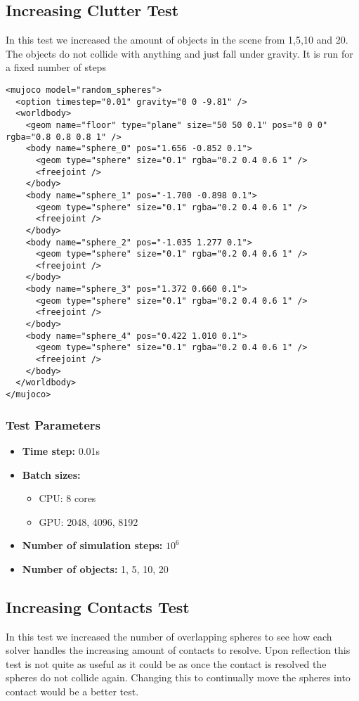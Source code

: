 \documentclass[11pt,a4paper]{article}
\begin{document}
\subsection{Increasing Clutter Test}
In this test we increased the amount of objects in the scene from 1,5,10 and 20. The objects do not collide with anything and just fall under gravity. It is run for a fixed number of steps

\begin{lstlisting}[style=xmlstyle, caption={Cluttered XML model}, label=lst:cluttered_xml]
<mujoco model="random_spheres">
  <option timestep="0.01" gravity="0 0 -9.81" />
  <worldbody>
    <geom name="floor" type="plane" size="50 50 0.1" pos="0 0 0" rgba="0.8 0.8 0.8 1" />
    <body name="sphere_0" pos="1.656 -0.852 0.1">
      <geom type="sphere" size="0.1" rgba="0.2 0.4 0.6 1" />
      <freejoint />
    </body>
    <body name="sphere_1" pos="-1.700 -0.898 0.1">
      <geom type="sphere" size="0.1" rgba="0.2 0.4 0.6 1" />
      <freejoint />
    </body>
    <body name="sphere_2" pos="-1.035 1.277 0.1">
      <geom type="sphere" size="0.1" rgba="0.2 0.4 0.6 1" />
      <freejoint />
    </body>
    <body name="sphere_3" pos="1.372 0.660 0.1">
      <geom type="sphere" size="0.1" rgba="0.2 0.4 0.6 1" />
      <freejoint />
    </body>
    <body name="sphere_4" pos="0.422 1.010 0.1">
      <geom type="sphere" size="0.1" rgba="0.2 0.4 0.6 1" />
      <freejoint />
    </body>
  </worldbody>
</mujoco>
\end{lstlisting}

\subsubsection{Test Parameters}
\begin{itemize}
    \item \textbf{Time step:} 0.01s
    \item \textbf{Batch sizes:} 
    \begin{itemize}
        \item CPU: 8 cores 
        \item GPU: 2048, 4096, 8192
    \end{itemize}
    \item \textbf{Number of simulation steps:} $10^6$
    \item \textbf{Number of objects:} 1, 5, 10, 20
\end{itemize}

\subsection{Increasing Contacts Test}
In this test we increased the number of overlapping spheres to see how each solver handles the increasing amount of contacts to resolve. Upon reflection this test is not quite as useful as it could be as once the contact is resolved the spheres do not collide again. Changing this to continually move the spheres into contact would be a better test.
\end{document}
